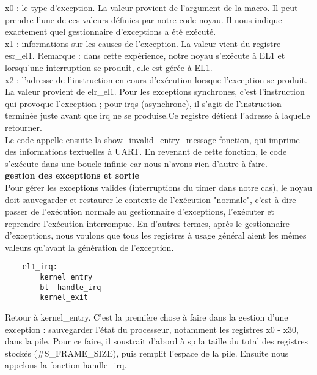 \documentclass[12pt,a4paper,oneside]{book}
\begin{document}
x0 : le type d'exception. La valeur provient de l'argument de la macro. Il peut prendre l'une de ces valeurs définies par notre code noyau. Il nous indique exactement quel gestionnaire d'exceptions a été exécuté.\\
x1 : informations sur les causes de l'exception. La valeur vient du registre esr\_el1. Remarque : dans cette expérience, notre noyau s'exécute à EL1 et lorsqu'une interruption se produit, elle est gérée à EL1.\\
x2 : l'adresse de l'instruction en cours d'exécution lorsque l'exception se produit. La valeur provient de elr\_el1. Pour les exceptions synchrones, c'est l'instruction qui provoque l'exception ; pour irqs (asynchrone), il s'agit de l'instruction terminée juste avant que irq ne se produise.Ce registre détient l'adresse à laquelle retourner.\\
Le code appelle ensuite la show\_invalid\_entry\_message fonction, qui imprime des informations textuelles à UART. En revenant de cette fonction, le code s'exécute dans une boucle infinie car nous n'avons rien d'autre à faire.\\

\textbf{gestion des exceptions et sortie}\\
Pour gérer les exceptions valides (interruptions du timer dans notre cas), le noyau doit sauvegarder et restaurer le contexte de l'exécution "normale", c'est-à-dire passer de l'exécution normale au gestionnaire d'exceptions, l'exécuter et reprendre l'exécution interrompue. En d'autres termes, après le gestionnaire d'exceptions, nous voulons que tous les registres à usage général aient les mêmes valeurs qu'avant la génération de l'exception.\\
\begin{lstlisting}
	el1_irq:
		kernel_entry 
		bl	handle_irq
		kernel_exit
\end{lstlisting}

Retour à kernel\_entry. C'est la première chose à faire dans la gestion d'une exception : sauvegarder l'état du processeur, notamment les registres x0 - x30, dans la pile. Pour ce faire, il soustrait d'abord à sp la taille du total des registres stockés (\#S\_FRAME\_SIZE), puis remplit l'espace de la pile. Ensuite nous appelons la fonction handle\_irq.\\
\end{document}
